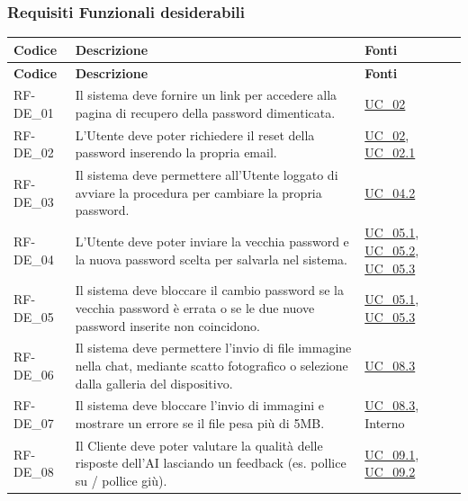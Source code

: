 \subsubsection{Requisiti Funzionali desiderabili}
\renewcommand{\arraystretch}{1.15}
\begin{longtable}{|>{\raggedright}p{}|>{\raggedright\arraybackslash}p{}|>{\raggedright\arraybackslash}p{}|}
    \hline
    \rowcolor[gray]{0.9}
    \textbf{Codice} & \textbf{Descrizione} & \textbf{Fonti} \\
    \hline
    \endfirsthead
    \hline
    \rowcolor[gray]{0.9}
    \textbf{Codice} & \textbf{Descrizione} & \textbf{Fonti} \\
    \hline
    \endhead
    \hline
    RF-DE\_01 \hypertarget{rf-de_1} & Il sistema deve fornire un link per accedere alla pagina di recupero della password dimenticata. & \hyperref[uc_02]{UC\_02} \\
    \hline
    RF-DE\_02 \hypertarget{rf-de_2} & L'Utente deve poter richiedere il reset della password inserendo la propria email. & \hyperref[uc_02]{UC\_02}, \hyperref[uc_02.1]{UC\_02.1} \\
    \hline
    RF-DE\_03 \hypertarget{rf-de_3} & Il sistema deve permettere all'Utente loggato di avviare la procedura per cambiare la propria password. & \hyperref[uc_04.2]{UC\_04.2} \\
    \hline
    RF-DE\_04 \hypertarget{rf-de_4} & L'Utente deve poter inviare la vecchia password e la nuova password scelta per salvarla nel sistema. & \hyperref[uc_05.1]{UC\_05.1}, \hyperref[uc_05.2]{UC\_05.2}, \hyperref[uc_05.3]{UC\_05.3} \\
    \hline
    RF-DE\_05 \hypertarget{rf-de_5} & Il sistema deve bloccare il cambio password se la vecchia password è errata o se le due nuove password inserite non coincidono. & \hyperref[uc_05.1]{UC\_05.1}, \hyperref[uc_05.3]{UC\_05.3} \\
    \hline
    RF-DE\_06 \hypertarget{rf-de_6} & Il sistema deve permettere l'invio di file immagine nella chat, mediante scatto fotografico o selezione dalla galleria del dispositivo. & \hyperref[uc_08.3]{UC\_08.3} \\
    \hline
    RF-DE\_07 \hypertarget{rf-de_7} & Il sistema deve bloccare l'invio di immagini e mostrare un errore se il file pesa più di 5MB. & \hyperref[uc_08.3]{UC\_08.3}, Interno \\
    \hline
    RF-DE\_08 \hypertarget{rf-de_8} & Il Cliente deve poter valutare la qualità delle risposte dell'AI lasciando un feedback (es. pollice su / pollice giù). & \hyperref[uc_09.1]{UC\_09.1}, \hyperref[uc_09.2]{UC\_09.2} \\

\end{longtable}
